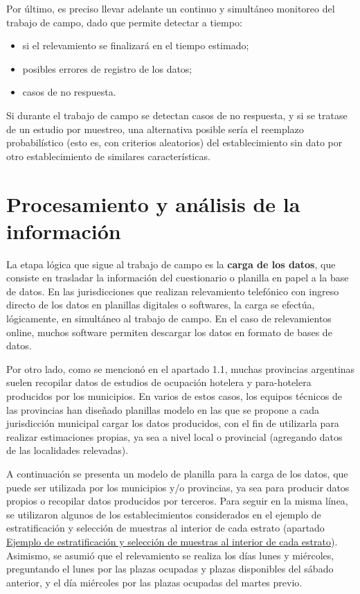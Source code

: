 \documentclass[
]{book}
\begin{document}
Por último, es preciso llevar adelante un continuo y simultáneo monitoreo del trabajo de campo, dado que permite detectar a tiempo:

\begin{itemize}
\item
  si el relevamiento se finalizará en el tiempo estimado;
\item
  posibles errores de registro de los datos;
\item
  casos de no respuesta.
\end{itemize}

Si durante el trabajo de campo se detectan casos de no respuesta, y si se tratase de un estudio por muestreo, una alternativa posible sería el reemplazo probabilístico (esto es, con criterios aleatorios) del establecimiento sin dato por otro establecimiento de similares características.

\hypertarget{procesamiento-y-anuxe1lisis-de-la-informaciuxf3n}{%
\section{Procesamiento y análisis de la información}\label{procesamiento-y-anuxe1lisis-de-la-informaciuxf3n}}

La etapa lógica que sigue al trabajo de campo es la \textbf{carga de los datos}, que consiste en trasladar la información del cuestionario o planilla en papel a la base de datos. En las jurisdicciones que realizan relevamiento telefónico con ingreso directo de los datos en planillas digitales o softwares, la carga se efectúa, lógicamente, en simultáneo al trabajo de campo. En el caso de relevamientos online, muchos software permiten descargar los datos en formato de bases de datos.

Por otro lado, como se mencionó en el apartado 1.1, muchas provincias argentinas suelen recopilar datos de estudios de ocupación hotelera y para-hotelera producidos por los municipios. En varios de estos casos, los equipos técnicos de las provincias han diseñado planillas modelo en las que se propone a cada jurisdicción municipal cargar los datos producidos, con el fin de utilizarla para realizar estimaciones propias, ya sea a nivel local o provincial (agregando datos de las localidades relevadas).

A continuación se presenta un modelo de planilla para la carga de los datos, que puede ser utilizada por los municipios y/o provincias, ya sea para producir datos propios o recopilar datos producidos por terceros. Para seguir en la misma línea, se utilizaron algunos de los establecimientos considerados en el ejemplo de estratificación y selección de muestras al interior de cada estrato (apartado \protect\hyperlink{ejemplo-de-estratificaciuxf3n-y-selecciuxf3n-de-muestras-al-interior-de-cada-estrato}{Ejemplo de estratificación y selección de muestras al interior de cada estrato}). Asimismo, se asumió que el relevamiento se realiza los días lunes y miércoles, preguntando el lunes por las plazas ocupadas y plazas disponibles del sábado anterior, y el día miércoles por las plazas ocupadas del martes previo.
\end{document}
